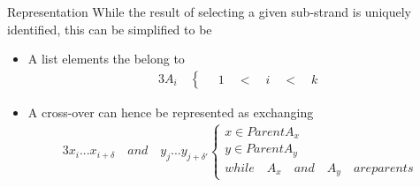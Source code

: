 \documentclass{beamer}
\begin{document}
\begin{frame}{Representation}
  While the result of selecting a given sub-strand is uniquely identified, this can be simplified to be
  \pause
  \begin{itemize}
  \item A list elements the belong to 
    \begin{alignat}{3}
      A_i\quad 
      \begin{cases}
        \quad 1\quad <\quad i\quad <\quad k
      \end{cases}
    \end{alignat}
    \pause
  \item A cross-over can hence be represented as exchanging
    \begin{alignat}{3}
      x_{i}...x_{i + \delta}\quad and\quad y_{j}...y_{j + \delta'}
      \begin{cases}
        x \in Parent A_x\\
        y \in Parent A_y\\
        while\quad A_x\quad and\quad A_y\quad are parents
      \end{cases}
    \end{alignat}
  \end{itemize}
\end{frame}




\end{document}
